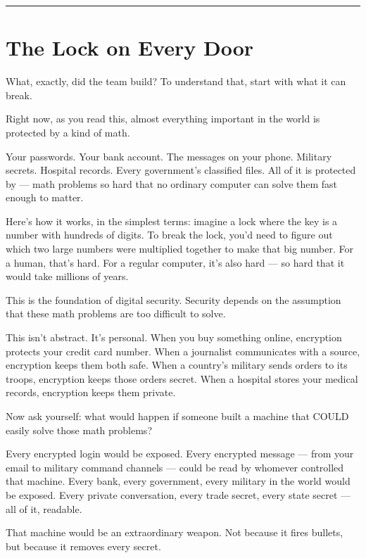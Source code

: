 \vspace{1cm}\noindent\rule{0.5\textwidth}{0.5pt}\vspace{0.5cm}

\section*{The Lock on Every Door}
\label{front:the-lock-on-every-door}

What, exactly, did the team build? To understand that, start with what it can break.

Right now, as you read this, almost everything important in the world is protected by a kind of math.

Your passwords. Your bank account. The messages on your phone. Military secrets. Hospital records. Every government's classified files. All of it is protected by  --- math problems so hard that no ordinary computer can solve them fast enough to matter.

Here's how it works, in the simplest terms: imagine a lock where the key is a number with hundreds of digits. To break the lock, you'd need to figure out which two large numbers were multiplied together to make that big number. For a human, that's hard. For a regular computer, it's also hard --- so hard that it would take millions of years.

This is the foundation of digital security. Security depends on the assumption that these math problems are too difficult to solve.

This isn't abstract. It's personal. When you buy something online, encryption protects your credit card number. When a journalist communicates with a source, encryption keeps them both safe. When a country's military sends orders to its troops, encryption keeps those orders secret. When a hospital stores your medical records, encryption keeps them private.

Now ask yourself: what would happen if someone built a machine that COULD easily solve those math problems?

Every encrypted login would be exposed. Every encrypted message --- from your email to military command channels --- could be read by whomever controlled that machine. Every bank, every government, every military in the world would be exposed. Every private conversation, every trade secret, every state secret --- all of it, readable.

That machine would be an extraordinary weapon. Not because it fires bullets, but because it removes every secret.

